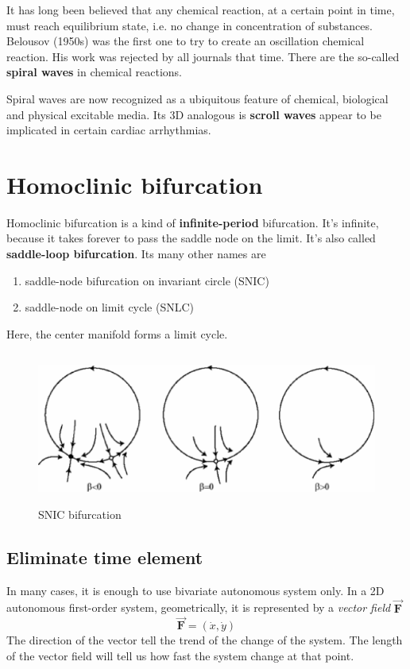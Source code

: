 It has long been believed that any chemical reaction, at a certain
point in time, must reach equilibrium state, i.e. no change in
concentration of substances. Belousov (1950s) was the first one to try
to create an oscillation chemical reaction. His work was rejected by
all journals that time. There are the so-called {\bf spiral waves} in
chemical reactions.

Spiral waves are now recognized as a ubiquitous feature of chemical,
biological and physical excitable media. Its 3D analogous is {\bf
  scroll waves} appear to be implicated in certain cardiac
arrhythmias. 

\section{Homoclinic bifurcation}
\label{sec:homocl-bifurc}

Homoclinic bifurcation is a kind of {\bf infinite-period}
bifurcation. It's infinite, because it takes forever to pass the
saddle node on the limit. It's also called
{\bf saddle-loop bifurcation}. Its many other names are
\begin{enumerate}
\item saddle-node bifurcation on invariant circle (SNIC) 
\item saddle-node on limit cycle (SNLC)
\end{enumerate}
Here, the center manifold forms a limit cycle. 

\begin{figure}[hbt]
  \centerline{\includegraphics[height=5cm,
    angle=0]{./images/SNIC_bifurcation.eps}}
\caption{SNIC bifurcation}
\label{fig:SNIC}
\end{figure}

\subsection{Eliminate time element}
\label{sec:elim-time-elem}

In many cases, it is enough to use bivariate autonomous system only.
In a 2D autonomous first-order system, geometrically, it is
represented by a {\it vector field} $\overrightarrow{\mathbf{F}}$
\begin{equation}
  \label{eq:582}
  \overrightarrow{\mathbf{F}} = (\dot{x},\dot{y}) 
\end{equation}
The direction of the vector tell the trend of the change of the
system. The length of the vector field will tell us how fast the
system change at that point.

